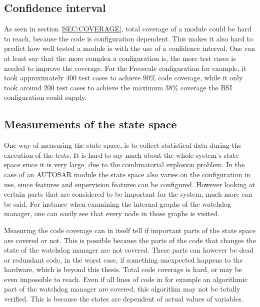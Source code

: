 \subsection{Confidence interval}
As seen in section \ref{SEC:COVERAGE}, total coverage of a module
could be hard to reach, because the code is configuration
dependent. This makes it also hard to predict how well tested a module
is with the use of a confidence interval. One can at least say that
the more complex a configuration is, the more test cases is needed to
improve the coverage. For the Freescale configuration for example, it
took approximately 400 test cases to achieve 90\% code coverage, while
it only took around 200 test cases to achieve the maximum 38\%
coverage the BSI configuration could supply.

\subsection{Measurements of the state space}
One way of measuring the state space, is to collect statistical data during the
execution of the tests. It is hard to say much about the whole system's state
space since it is very large, due to the combinatorial explosion problem. In the
case of an AUTOSAR module the state space also varies on the configuration in
use, since features and supervision features can be configured.  However looking
at certain parts that are considered to be important for the system, much more
can be said. For instance when examining the internal graphs of the watchdog
manager, one can easily see that every node in those graphs is visited.

Measuring the code coverage can in itself tell if important parts of
the state space are covered or not. This is possible because the parts
of the code that changes the state of the watchdog manager are not
covered. These parts can however be dead or redundant code, in the
worst case, if something unexpected happens to the hardware, which is
beyond this thesis. Total code coverage is hard, or may be even
impossible to reach.  Even if all lines of code in for example an
algorithmic part of the watchdog manager are covered, this algorithm
may not be totally verified. This is because the states are dependent
of actual values of variables.
